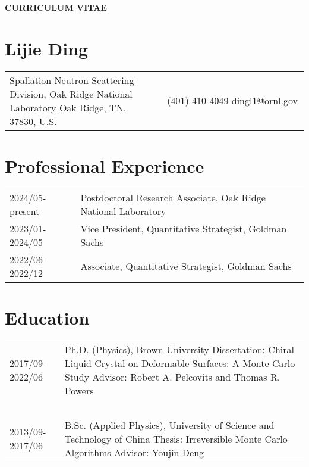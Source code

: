 \documentclass[11pt,letterpaper]{article}
\begin{document}
\pagestyle{headings}
\begin{center}
    \Large{\textbf{CURRICULUM VITAE}}
\end{center}
\section*{Lijie Ding}
\vspace*{-0.15in}
\begin{longtable}{p{0.5\linewidth} p{0.5\linewidth}}
    Spallation Neutron Scattering Division, \newline
    Oak Ridge National Laboratory \newline
    Oak Ridge, TN, 37830, U.S.
     & ~\newline
    (401)-410-4049 \newline
    dingl1@ornl.gov
\end{longtable}


\section*{Professional Experience}
\vspace*{-0.15in}
\begin{longtable}{l p{\linewidth}}
    2024/05-present & Postdoctoral Research Associate, Oak Ridge National Laboratory \\
    2023/01-2024/05 & Vice President, Quantitative Strategist, Goldman Sachs \\
    2022/06-2022/12 & Associate, Quantitative Strategist, Goldman Sachs \\
\end{longtable}


\section*{Education}
\vspace*{-0.15in}
\begin{longtable}{l p{\linewidth}}
    2017/09-2022/06        & Ph.D. (Physics), Brown University \newline
    Dissertation: Chiral Liquid Crystal on Deformable Surfaces: A Monte Carlo Study \newline
    Advisor: Robert A. Pelcovits and Thomas R. Powers                                                 \\~\\
    2013/09-2017/06        & B.Sc. (Applied Physics), University of Science and Technology of China \newline
    Thesis: Irreversible Monte Carlo Algorithms \newline
    Advisor: Youjin Deng
\end{longtable}
\end{document}
